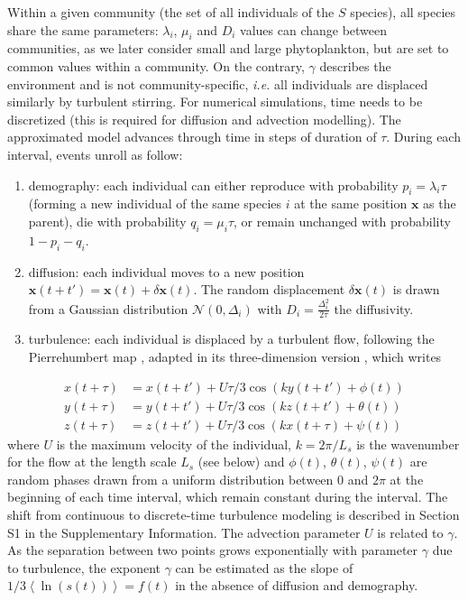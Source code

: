 \documentclass[english]{article}
\begin{document}
Within a given community (the set of all individuals of the $S$ species),
all species share the same parameters: $\lambda_{i}$, $\mu_{i}$
and $D_{i}$ values can change between communities, as we later consider
small and large phytoplankton, but are set to common values within
a community. On the contrary, $\gamma$ describes the environment
and is not community-specific, \textit{i.e.} all individuals are displaced
similarly by turbulent stirring.  For numerical simulations, time
needs to be discretized (this is required for diffusion and advection
modelling). The approximated model advances through time in steps
of duration of $\tau$. During each interval, events unroll as follow:

\begin{enumerate}
\item demography: each individual can either reproduce with probability
$p_{i}=\lambda_{i}\tau$ (forming a new individual of the same species
$i$ at the same position $\mathbf{x}$ as the parent), die with probability
$q_{i}=\mu_{i}\tau$, or remain unchanged with probability $1-p_{i}-q_{i}$.
\item diffusion: each individual moves to a new position $\mathbf{x}(t+t')=\mathbf{x}(t)+\delta\mathbf{x}(t)$.
The random displacement $\delta\mathbf{x}(t)$ is drawn from a Gaussian
distribution $\mathcal{N}(0,\Delta_{i})$ with $D_{i}=\frac{\Delta_{i}^{2}}{2\tau}$
the diffusivity.
\item turbulence: each individual is displaced by a turbulent flow, following
the Pierrehumbert map \citep{pierrehumbert_tracer_1994}, adapted
in its three-dimension version \citep{ngan_scalar_2011}, which writes
\end{enumerate}
\begin{equation}
\begin{array}{cc}
x(t+\tau) & =x(t+t')+U\tau/3\cos\left(ky(t+t')+\phi(t)\right)\\
y(t+\tau) & =y(t+t')+U\tau/3\cos\left(kz(t+t')+\theta(t)\right)\\
z(t+\tau) & =z(t+t')+U\tau/3\cos\left(kx(t+\tau)+\psi(t)\right)
\end{array}
\end{equation}
where $U$ is the maximum velocity of the individual, $k=2\pi/L_{s}$
is the wavenumber for the flow at the length scale $L_{s}$ (see below)
and $\phi(t)$, $\theta(t)$, $\psi(t)$ are random phases drawn from
a uniform distribution between $0$ and $2\pi$ at the beginning of
each time interval, which remain constant during the interval. The
shift from continuous to discrete-time turbulence modeling is described
in Section S1 in the Supplementary Information. The advection parameter
$U$ is related to $\gamma$. As the separation between two points
grows exponentially with parameter $\gamma$ due to turbulence, the exponent $\gamma$ can be estimated as the
slope of $1/3\left\langle \ln(s(t))\right\rangle =f(t)$ in the absence
of diffusion and demography.
\end{document}
